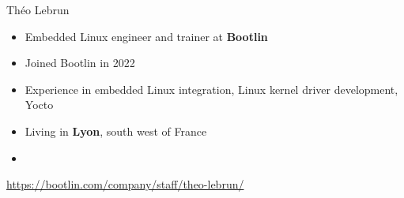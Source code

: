 \begin{frame}{Théo Lebrun}
  \begin{itemize}
  \item Embedded Linux engineer and trainer at {\bf Bootlin}
  \item Joined Bootlin in 2022
  \item Experience in embedded Linux integration, Linux kernel driver
    development, Yocto
  \item Living in {\bf Lyon}, south west of France
  \item {}
  \end{itemize}
  {\small \url{https://bootlin.com/company/staff/theo-lebrun/}}
\end{frame}
